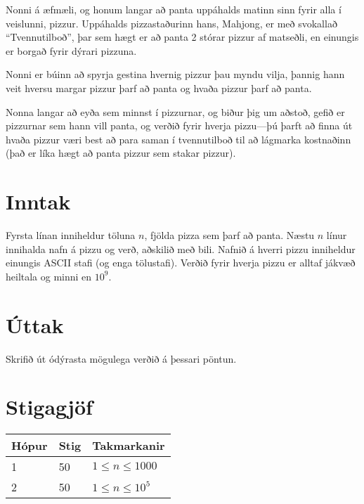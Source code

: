 %
Nonni á æfmæli, og honum langar að panta uppáhalds matinn sinn fyrir alla í veislunni, pizzur.
Uppáhalds pizzastaðurinn hans, Mahjong, er með svokallað ``Tvennutilboð'', þar sem hægt er að panta 2 stórar pizzur af matseðli, en einungis er borgað fyrir dýrari pizzuna.

Nonni er búinn að spyrja gestina hvernig pizzur þau myndu vilja, þannig hann veit hversu margar pizzur þarf að panta og hvaða pizzur þarf að panta.

Nonna langar að eyða sem minnst í pizzurnar, og biður þig um aðstoð, gefið er pizzurnar sem hann vill panta, og verðið fyrir hverja pizzu---þú þarft að finna út hvaða pizzur væri best að para saman í tvennutilboð til að lágmarka kostnaðinn (það er líka hægt að panta pizzur sem stakar pizzur).

\section*{Inntak}
Fyrsta línan inniheldur töluna $n$, fjölda pizza sem þarf að panta.
Næstu $n$ línur innihalda nafn á pizzu og verð, aðskilið með bili.
Nafnið á hverri pizzu inniheldur einungis ASCII stafi (og enga tölustafi).
Verðið fyrir hverja pizzu er alltaf jákvæð heiltala og minni en $10^9$.

\section*{Úttak}
Skrifið út ódýrasta mögulega verðið á þessari pöntun.\\

\section*{Stigagjöf}
\begin{tabular}{|l|l|l|}
\hline
Hópur & Stig & Takmarkanir \\ \hline
1     & 50   & $1 \leq n \leq 1000$ \\ \hline
2     & 50   & $1 \leq n \leq 10^5$\\ \hline
\end{tabular}

